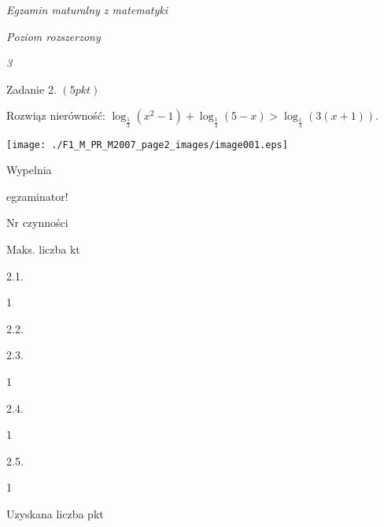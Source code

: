 \documentclass[a4paper,12pt]{article}
\begin{document}
{\it Egzamin maturalny z matematyki}

{\it Poziom rozszerzony}

{\it 3}

Zadanie 2. $(5pkt)$

Rozwiąz nierówność: $\log_{\frac{1}{3}}(x^{2}-1)+\log_{\frac{1}{3}}(5-x)>\log_{\frac{1}{3}}(3(x+1)).$
\begin{center}
\texttt{[image: ./F1\_M\_PR\_M2007\_page2\_images/image001.eps]}
\end{center}
Wypelnia

egzaminator!

Nr czynności

Maks. liczba kt

2.1.

1

2.2.

2.3.

1

2.4.

1

2.5.

1

Uzyskana liczba pkt
\end{document}
